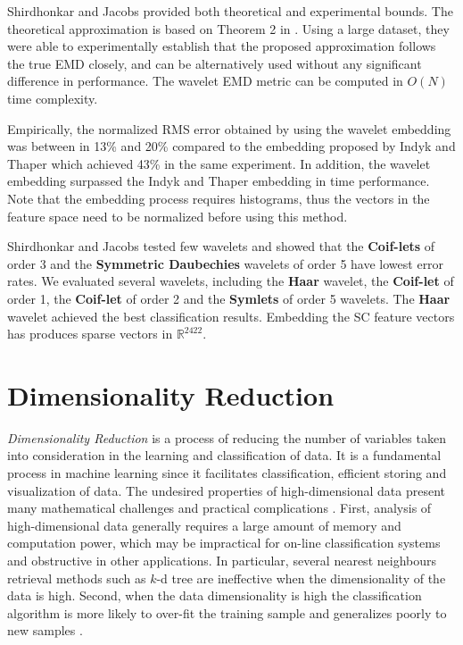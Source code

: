 \iftoggle{edit-mode}{\hspace{0pt}\marginpar{shirdhonkar - theoretical and empirical bounds}}{}
Shirdhonkar and Jacobs provided both theoretical and experimental bounds. 
The theoretical approximation is based on Theorem 2 in \cite{shirdhonkar2008approximate}. 
Using a large dataset, they were able to experimentally establish that the proposed approximation follows the true EMD closely, and can be alternatively used without any significant difference in performance. 
The wavelet EMD metric can be computed in $O\left( N \right)$ time complexity. 

\iftoggle{edit-mode}{\hspace{0pt}\marginpar{Performance - Indyk vs. shirdhonkar}}{}
Empirically, the normalized RMS error obtained by using the wavelet embedding was between in 13\% and 20\% compared to the embedding proposed by Indyk and Thaper which achieved 43\% in the same experiment. 
In addition, the wavelet embedding surpassed the Indyk and Thaper embedding in time performance.
Note that the embedding process requires histograms, thus the vectors in the feature space need to be normalized before using this method.

Shirdhonkar and Jacobs tested few wavelets and showed that the \textbf{Coif-lets} of order 3 and the \textbf{Symmetric Daubechies} wavelets of order 5 have lowest error rates. 
We evaluated several wavelets, including the \textbf{Haar} wavelet, the \textbf{Coif-let} of order 1, the \textbf{Coif-let} of order 2 and the \textbf{Symlets} of order 5 wavelets.
The \textbf{Haar} wavelet achieved the best classification results.
Embedding the SC feature vectors has produces sparse vectors in $\mathds{R}^{2422}$.

 
\newpage{}

\section{Dimensionality Reduction}
\label{sec:dr}

\iftoggle{edit-mode}{\hspace{0pt}\marginpar{What is DR and what techniques are there?}}{}
\emph{Dimensionality Reduction} is a process of reducing the number of variables taken into consideration in the learning and classification of data. 
It is a fundamental process in machine learning since it facilitates classification, efficient storing and visualization of data. 
The undesired properties of high-dimensional data present many mathematical challenges and practical complications \cite{van2009dimensionality}. 
First, analysis of high-dimensional data generally requires a large amount of memory and computation power, which may be impractical for on-line classification systems and obstructive in other applications. 
In particular, several nearest neighbours retrieval methods such as $k$-d tree are ineffective when the dimensionality of the data is high.
Second, when the data dimensionality is high the classification algorithm is more likely to over-fit the training sample and generalizes poorly to new samples \cite{aida2009word}.

